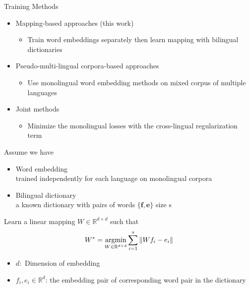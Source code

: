 \documentclass[11pt, a4paper, landscape]{article}
\newcommand*{\argmin}{\ensuremath{\operatornamewithlimits{argmin}}\xspace}
\begin{document}
	Training Methods
	\begin{itemize}
		\item Mapping-based approaches (this work)
		\begin{itemize}
			\item Train word embeddings separately then learn mapping with bilingual dictionaries
		\end{itemize}
		\item Pseudo-multi-lingual corpora-based approaches
		\begin{itemize}
			\item Use monolingual word embedding methods on mixed corpus of multiple languages 
		\end{itemize}
		\item Joint methods
		\begin{itemize}
			\item Minimize the monolingual losses with the cross-lingual regularization term
		\end{itemize}
	\end{itemize}
	
	\vfill
	\NewPage
	\vfill
	Assume we have
	\begin{itemize}
		\item Word embedding \\
		trained  independently for each language on monolingual corpora
		\item Bilingual dictionary \\
		a known dictionary with pairs of words ${ \{ \bm{f}, \bm{e} \} }$ size s
	\end{itemize}
	
	
	
	Learn a linear mapping ${W \in \mathbb{R}^{d \times d}}$ such that
	\[W^*= \argmin\limits_{W \in \mathbb{R}^{d \times d}} {\sum_{i=1}^{s} {\lVert Wf_i -e_i \rVert}} \]
	\begin{itemize}
		\item ${d:}$ Dimension of embedding
		\item $f_i, e_i \in \mathbb{R}^d $: the embedding pair of corresponding word pair in the dictionary
	\end{itemize}
	\vfill
	
	
	
\end{document}
